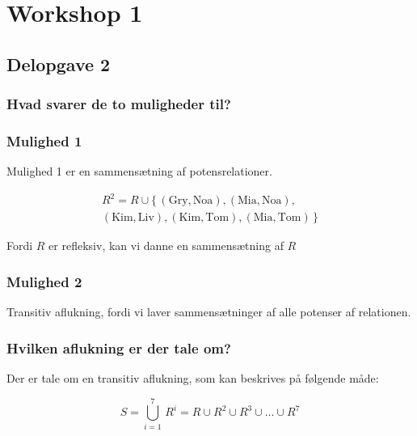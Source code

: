 \chapter{Workshop 1}\label{ch:workshop-1}




\section{Delopgave 2}\label{sec:delopgave-2}

\subsection{Hvad svarer de to muligheder til?}\label{subsec:hvad-svarer-de-to-muligheder-til?}

\subsection*{Mulighed 1}

Mulighed 1 er en sammensætning af potensrelationer.

\begin{equation}
    \begin{split}
        R^2 = R \cup \{\,(\text{Gry}, \text{Noa}), (\text{Mia}, \text{Noa}), \\
        (\text{Kim}, \text{Liv}), (\text{Kim}, \text{Tom}), (\text{Mia}, \text{Tom})\,\}
    \end{split}\label{eq:equation7}
\end{equation}

Fordi \(R\) er refleksiv, kan vi danne en sammensætning af \(R\)

\subsection*{Mulighed 2}
Transitiv aflukning, fordi vi laver sammensætninger af alle potenser af relationen.

\subsection{Hvilken aflukning er der tale om?}\label{subsec:hvilken-aflukning-er-der-tale-om?}
Der er tale om en transitiv aflukning, som kan beskrives på følgende måde:

\begin{equation}
    S = \bigcup_{i=1}^{7} \, R^{i} = R \cup R^2 \cup R^3 \cup \ldots \cup R^7 \label{eq:equation6}
\end{equation}


